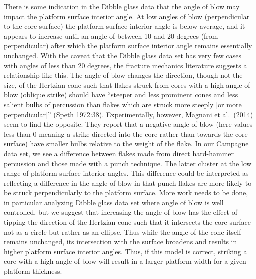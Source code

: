 \documentclass[10pt,letterpaper]{article}
\begin{document}
There is some indication in the Dibble glass data that the angle of blow
may impact the platform surface interior angle. At low angles of blow
(perpendicular to the core surface) the platform surface interior angle
is below average, and it appears to increase until an angle of between
10 and 20 degrees (from perpendicular) after which the platform surface
interior angle remains essentially unchanged. With the caveat that the
Dibble glass data set has very few cases with angles of less than 20
degrees, the fracture mechanics literature suggests a relationship like
this. The angle of blow changes the direction, though not the size, of
the Hertzian cone such that flakes struck from cores with a high angle
of blow (oblique strike) should have ``steeper and less prominent cones
and less salient bulbs of percussion than flakes which are struck more
steeply {[}or more perpendicular{]}'' (Speth 1972:38). Experimentally,
however, Magnani et al.~(2014) seem to find the opposite. They report
that a negative angle of blow (here values less than 0 meaning a strike
directed into the core rather than towards the core surface) have
smaller bulbs relative to the weight of the flake. In our Campagne data
set, we see a difference between flakes made from direct hard-hammer
percussion and those made with a punch technique. The latter cluster at
the low range of platform surface interior angles. This difference could
be interpreted as reflecting a difference in the angle of blow in that
punch flakes are more likely to be struck perpendicularly to the
platform surface. More work needs to be done, in particular analyzing
Dibble glass data set where angle of blow is well controlled, but we
suggest that increasing the angle of blow has the effect of tipping the
direction of the Hertzian cone such that it intersects the core surface
not as a circle but rather as an ellipse. Thus while the angle of the
cone itself remains unchanged, its intersection with the surface
broadens and results in higher platform surface interior angles. Thus,
if this model is correct, striking a core with a high angle of blow will
result in a larger platform width for a given platform thickness.
\end{document}
